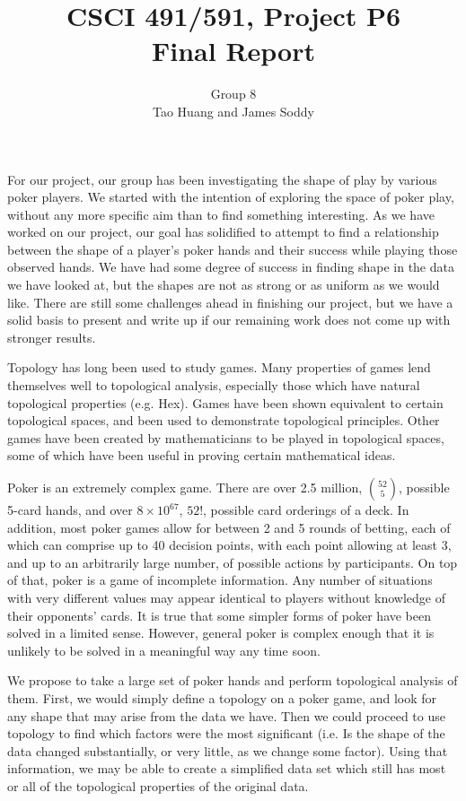 \documentclass[11pt]{article}
\title{CSCI 491/591, Project P6\\
		\small{Final Report}}
\author{Group 8\\
		\small{Tao Huang and James Soddy}}
\begin{document}
\maketitle

For our project, our group has been investigating the shape of play by various
poker players. We started with the intention of exploring the space of poker
play, without any more specific aim than to find something interesting. As we
have worked on our project, our goal has solidified to attempt to find a 
relationship between the shape of a player's poker hands and their success
while playing those observed hands. We have had some degree of success in finding
shape in the data we have looked at, but the shapes are not as strong or as 
uniform as we would like. There are still some challenges ahead in finishing our
project, but we have a solid basis to present and write up if our remaining work
does not come up with stronger results.

Topology has long been used to study games. Many properties of games
lend themselves well to topological analysis, especially those which have 
natural topological properties (e.g. Hex). Games have been shown equivalent to
certain topological spaces, and been used to demonstrate topological
principles\cite{Cao02}\cite{Gale79}. Other games have been created by mathematicians
to be played in topological spaces, some of which have been useful in proving
certain mathematical ideas\cite{TopoGame}\cite{BanachGame}\cite{Kenderov93}.

Poker is an extremely complex game. There are over 2.5 million, ${52 \choose 5}$,
possible 5-card hands, and over $8\times10^{67}$, $52!$, possible card orderings
of a deck. In addition, most poker games allow for between 2 and 5 rounds of betting,
each of which can comprise up to 40 decision points, with each point allowing
at least 3, and up to an arbitrarily large number, of possible actions by participants. On
top of that, poker is a game of incomplete information. Any number of situations
with very different values may appear identical to players without knowledge
of their opponents' cards. It is true that some simpler forms of poker have been
solved in a limited sense\cite{Bowling15}. However, general poker is complex
enough that it is unlikely to be solved in a meaningful way any time soon.

We propose to take a large set of poker hands and perform topological analysis of
them. First, we would simply define a topology on a poker game, and look for any
shape that may arise from the data we have. Then we could proceed to use topology
to find which factors were the most significant (i.e. Is the shape of the data
changed substantially, or very little, as we change some factor). Using that
information, we may be able to create a simplified data set which still has
most or all of the topological properties of the original data.
\end{document}
